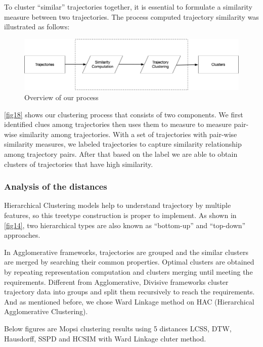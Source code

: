 \documentclass[a4paper, 12pt]{article}
\begin{document}
To cluster “similar” trajectories together, it is essential to formulate
a similarity measure between two trajectories. The process computed trajectory similarity was illustrated as follows:

\begin{figure}[ht]
    \centering
    \includegraphics[width=1\textwidth]{Process.png}
    \caption{Overview of our process}
    \label{fig18}
\end{figure}

\autoref{fig18} shows our clustering process that consists of two components. We first identified clues among trajectories then uses them to measure to measure pair-wise similarity among trajectories. With a set of trajectories with pair-wise similarity measures, we labeled trajectories to capture similarity relationship among trajectory pairs. After that based on the label we are able to obtain clusters of trajectories that have high similarity.

\subsubsection{Analysis of the distances}

Hierarchical Clustering models help to understand trajectory by multiple features, so this treetype construction is proper to implement. As shown in \autoref{fig14}, two hierarchical types are also known as “bottom-up” and “top-down” approaches.

In Agglomerative frameworks, trajectories are grouped and the similar clusters are merged by searching their common properties. Optimal clusters are obtained by repeating representation computation and clusters merging until meeting the requirements. Different from Agglomerative, Divisive frameworks cluster trajectory data into groups and split them recursively to reach the requirements. And as mentioned before, we chose Ward Linkage method on HAC (Hierarchical Agglomerative Clustering).

Below figures are Mopsi clustering results using 5 distances LCSS, DTW, Hausdorff, SSPD and HCSIM with Ward Linkage cluter method.
\end{document}
